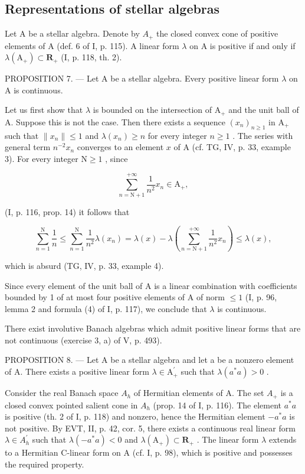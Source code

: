 \subsection{Representations of stellar algebras}

Let A be a stellar algebra. Denote by \(A_{+}\) the closed convex cone of positive elements of A (def. 6 of I, p. 115). A linear form \(\lambda\) on A is positive if and only if \(\lambda(\mathrm{A}_{+}) \subset \mathbf{R}_{+}\) (I, p. 118, th. 2).

PROPOSITION 7. --- Let A be a stellar algebra. Every positive linear form \(\lambda\) on A is continuous.

Let us first show that \(\lambda\) is bounded on the intersection of \(\mathrm{A}_{+}\) and the unit ball of A. Suppose this is not the case. Then there exists a sequence \((x_{n})_{n\geqslant 1}\) in \(\mathrm{A}_{+}\) such that \(\| x_n\| \leqslant 1\) and \(\lambda (x_n)\geqslant n\) for every integer \(n\geqslant 1\) . The series with general term \(n^{-2}x_{n}\) converges to an element \(x\) of A (cf. TG, IV, p. 33, example 3). For every integer \(\mathrm{N}\geqslant 1\) , since

\[
\sum_ {n = \mathrm{N} + 1} ^ {+ \infty} \frac {1}{n ^ {2}} x _ {n} \in \mathrm{A} _ {+},
\]

(I, p. 116, prop. 14) it follows that

\[
\sum_ {n = 1} ^ {\mathrm{N}} \frac {1}{n} \leqslant \sum_ {n = 1} ^ {\mathrm{N}} \frac {1}{n ^ {2}} \lambda (x _ {n}) = \lambda (x) - \lambda \left(\sum_ {n = \mathrm{N} + 1} ^ {+ \infty} \frac {1}{n ^ {2}} x _ {n}\right) \leqslant \lambda (x),
\]

which is absurd (TG, IV, p. 33, example 4).

Since every element of the unit ball of A is a linear combination with coefficients bounded by 1 of at most four positive elements of A of norm \(\leqslant 1\) (I, p. 96, lemma 2 and formula (4) of I, p. 117), we conclude that \(\lambda\) is continuous.

There exist involutive Banach algebras which admit positive linear forms that are not continuous (exercise 3, a) of V, p. 493).

PROPOSITION 8. --- Let A be a stellar algebra and let a be a nonzero element of A. There exists a positive linear form \(\lambda \in \mathrm{A}_{+}^{\prime}\) such that \(\lambda(a^{*}a) > 0\) .

Consider the real Banach space \(A_{h}\) of Hermitian elements of A. The set \(A_{+}\) is a closed convex pointed salient cone in \(A_{h}\) (prop. 14 of I, p. 116). The element \(a^{*}a\) is positive (th. 2 of I, p. 118) and nonzero, hence the Hermitian element \(-a^{*}a\) is not positive. By EVT, II, p. 42, cor. 5, there exists a continuous real linear form \(\lambda\in A_{h}^{\prime}\) such that \(\lambda(-a^{*}a)<0\) and \(\lambda(\mathrm{A}_{+})\subset\mathbf{R}_{+}\) . The linear form \(\lambda\) extends to a Hermitian C-linear form on A (cf. I, p. 98), which is positive and possesses the required property.

